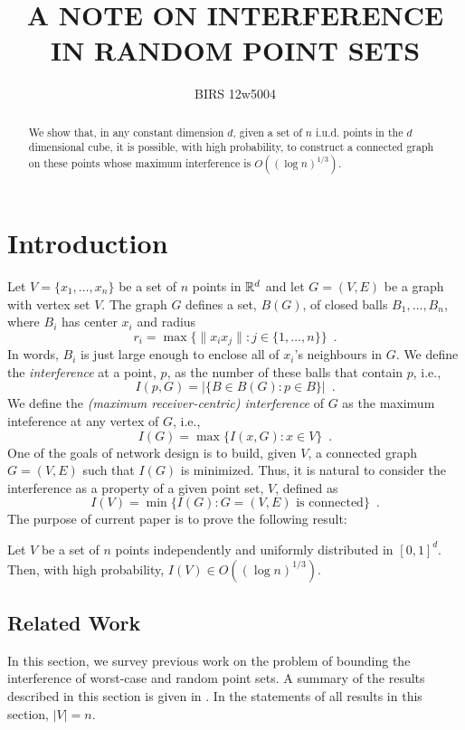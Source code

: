 \documentclass{patmorin}
\title{\MakeTextUppercase{A Note on Interference in Random Point Sets}}
\author{BIRS 12w5004}
\begin{document}
\maketitle

\begin{abstract}
  We show that, in any constant dimension $d$, given a set of $n$
  i.u.d. points in the $d$ dimensional cube, it is possible, with high
  probability, to construct a connected graph on these points whose
  maximum interference is $O((\log n)^{1/3})$.
\end{abstract}

\section{Introduction}


Let $V=\{x_1,\ldots,x_n\}$ be a set of $n$ points in $\mathbb{R}^d$ and let
$G=(V,E)$ be a graph with vertex set $V$.  The graph $G$ defines a set,
$B(G)$, of closed balls $B_1,\ldots,B_n$, where $B_i$ has center $x_i$
and radius
\[
   r_i = \max\{\|x_ix_j\| : j\in\{1,\ldots,n\}\} \enspace .
\]
In words, $B_i$ is just large enough to enclose all of $x_i$'s neighbours
in $G$.  We define the \emph{interference} at a point, $p$, as the
number of
these balls that contain $p$, i.e.,
\[
    I(p,G) = |\{B\in B(G) : p\in B\}| \enspace .
\]
We define the \emph{(maximum receiver-centric) interference} of $G$ as the
maximum inteference at any vertex of $G$, i.e.,
\[
   I(G) = \max\{I(x,G) : x\in V\} \enspace .
\]
One of the goals of network design is to build, given $V$, a connected
graph $G=(V,E)$ such that $I(G)$ is minimized.  Thus, it is natural to consider the interference as a property of a given point set, $V$, defined as
\[
  I(V) = \min\{I(G) : \mbox{$G=(V,E)$ is connected}\} \enspace .
\]
The purpose of current paper is to prove the following result:
\begin{thm}
  Let $V$ be a set of $n$ points independently and uniformly distributed
  in $[0,1]^d$.  Then, with high probability, $I(V)\in O((\log n)^{1/3})$.
\end{thm}

\subsection{Related Work}

In this section, we survey previous work on the problem of bounding
the interference of worst-case and random point sets.  A summary of the
results described in this section is given in .  In the statements of all results in this section, $|V|=n$.
\end{document}

